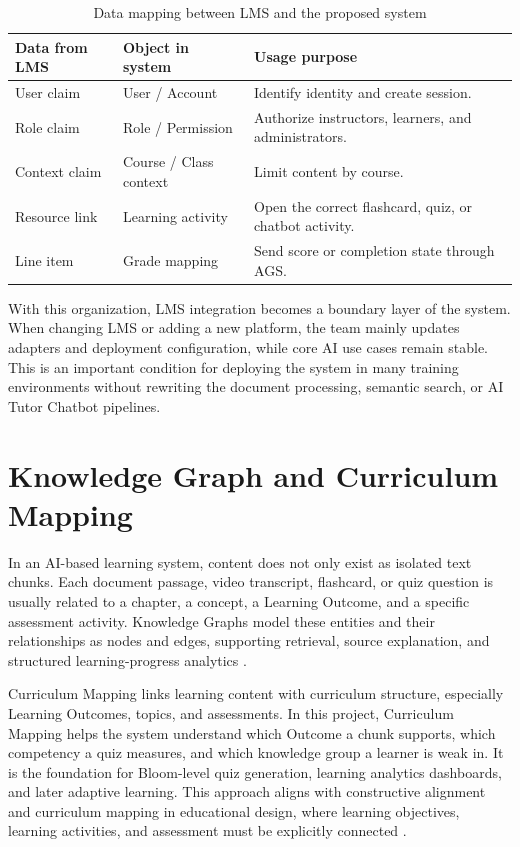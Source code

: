 \begin{table}[H]
    \centering
    \caption{Data mapping between LMS and the proposed system}
    \label{tab:lms-data-mapping}
    \begin{tabular}{p{4cm}p{4.2cm}p{5.3cm}}
        \toprule
        \textbf{Data from LMS} & \textbf{Object in system} & \textbf{Usage purpose} \\
        \midrule
        User claim & User / Account & Identify identity and create session. \\
        Role claim & Role / Permission & Authorize instructors, learners, and administrators. \\
        Context claim & Course / Class context & Limit content by course. \\
        Resource link & Learning activity & Open the correct flashcard, quiz, or chatbot activity. \\
        Line item & Grade mapping & Send score or completion state through AGS. \\
        \bottomrule
    \end{tabular}
\end{table}

With this organization, LMS integration becomes a boundary layer of the
system. When changing LMS or adding a new platform, the team mainly
updates adapters and deployment configuration, while core AI use cases
remain stable. This is an important condition for deploying the system in
many training environments without rewriting the document processing,
semantic search, or AI Tutor Chatbot pipelines.

\section{Knowledge Graph and Curriculum Mapping}
\label{sec:knowledge-graph-curriculum-mapping}

In an AI-based learning system, content does not only exist as isolated
text chunks. Each document passage, video transcript, flashcard, or quiz
question is usually related to a chapter, a concept, a Learning Outcome,
and a specific assessment activity. Knowledge Graphs model these entities
and their relationships as nodes and edges, supporting retrieval, source
explanation, and structured learning-progress analytics
\cite{hogan2021knowledgegraphs}.

Curriculum Mapping links learning content with curriculum structure,
especially Learning Outcomes, topics, and assessments. In this project,
Curriculum Mapping helps the system understand which Outcome a chunk
supports, which competency a quiz measures, and which knowledge group a
learner is weak in. It is the foundation for Bloom-level quiz generation,
learning analytics dashboards, and later adaptive learning. This approach
aligns with constructive alignment and curriculum mapping in educational
design, where learning objectives, learning activities, and assessment
must be explicitly connected
\cite{biggs1996constructive,harden2001curriculum}.

